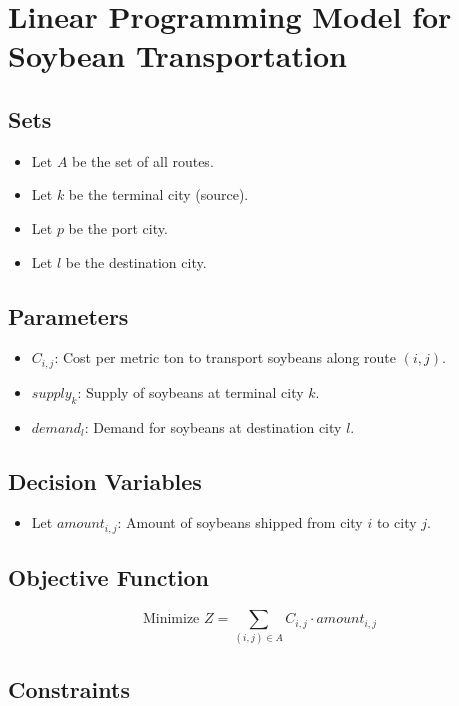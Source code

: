 \documentclass{article}
\begin{document}
\section*{Linear Programming Model for Soybean Transportation}

\subsection*{Sets}
\begin{itemize}
    \item Let \( A \) be the set of all routes.
    \item Let \( k \) be the terminal city (source).
    \item Let \( p \) be the port city.
    \item Let \( l \) be the destination city.
\end{itemize}

\subsection*{Parameters}
\begin{itemize}
    \item \( C_{i,j} \): Cost per metric ton to transport soybeans along route \( (i, j) \).
    \item \( supply_k \): Supply of soybeans at terminal city \( k \).
    \item \( demand_l \): Demand for soybeans at destination city \( l \).
\end{itemize}

\subsection*{Decision Variables}
\begin{itemize}
    \item Let \( amount_{i,j} \): Amount of soybeans shipped from city \( i \) to city \( j \).
\end{itemize}

\subsection*{Objective Function}
\[
\text{Minimize } Z = \sum_{(i,j) \in A} C_{i,j} \cdot amount_{i,j}
\]

\subsection*{Constraints}
\end{document}
